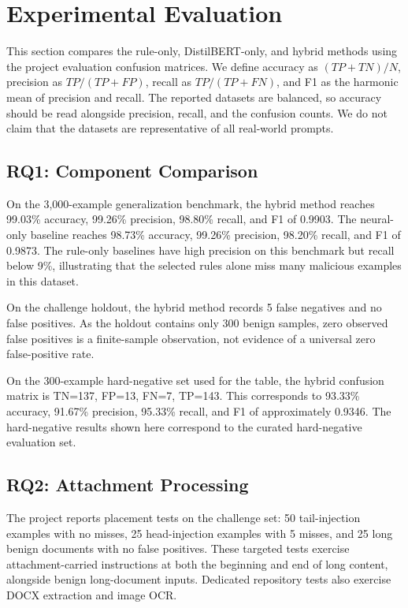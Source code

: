 \documentclass[conference]{IEEEtran}
\begin{document}
\section{Experimental Evaluation}
This section compares the rule-only, DistilBERT-only, and hybrid methods using the project evaluation confusion matrices. We define accuracy as $(TP + TN) / N$, precision as $TP / (TP + FP)$, recall as $TP / (TP + FN)$, and F1 as the harmonic mean of precision and recall. The reported datasets are balanced, so accuracy should be read alongside precision, recall, and the confusion counts. We do not claim that the datasets are representative of all real-world prompts.

\subsection{RQ1: Component Comparison}
On the 3,000-example generalization benchmark, the hybrid method reaches 99.03\% accuracy, 99.26\% precision, 98.80\% recall, and F1 of 0.9903. The neural-only baseline reaches 98.73\% accuracy, 99.26\% precision, 98.20\% recall, and F1 of 0.9873. The rule-only baselines have high precision on this benchmark but recall below 9\%, illustrating that the selected rules alone miss many malicious examples in this dataset.

On the challenge holdout, the hybrid method records 5 false negatives and no false positives. As the holdout contains only 300 benign samples, zero observed false positives is a finite-sample observation, not evidence of a universal zero false-positive rate.

On the 300-example hard-negative set used for the table, the hybrid confusion matrix is TN=137, FP=13, FN=7, TP=143. This corresponds to 93.33\% accuracy, 91.67\% precision, 95.33\% recall, and F1 of approximately 0.9346. The hard-negative results shown here correspond to the curated hard-negative evaluation set.

\subsection{RQ2: Attachment Processing}
The project reports placement tests on the challenge set: 50 tail-injection examples with no misses, 25 head-injection examples with 5 misses, and 25 long benign documents with no false positives. These targeted tests exercise attachment-carried instructions at both the beginning and end of long content, alongside benign long-document inputs. Dedicated repository tests also exercise DOCX extraction and image OCR.
\end{document}
